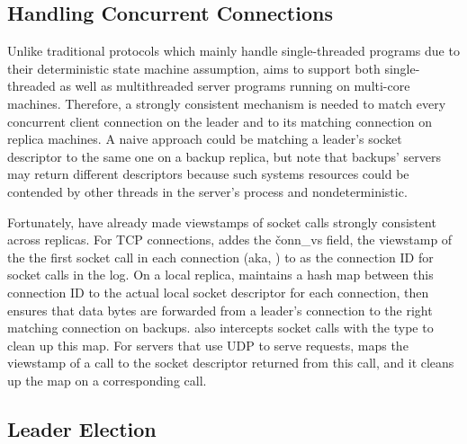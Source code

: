 
\subsection{Handling Concurrent Connections} \label{sec:concurrent}

Unlike traditional \paxos protocols which mainly handle single-threaded 
programs due to their deterministic state machine assumption, \xxx aims to 
support both single-threaded as well as multithreaded server programs running 
on multi-core machines. Therefore, a strongly consistent mechanism is needed to 
match every concurrent client connection on the leader and to its matching 
connection on replica machines. A naive approach could be matching a leader's 
socket descriptor to the same one on a backup replica, but note that backups' 
servers may return different descriptors because such systems resources could 
be contended by other threads in the server's process and nondeterministic.

Fortunately, \paxos have already made viewstamps of socket calls strongly 
consistent across replicas. For TCP connections, \xxx addes the 
\v{conn\_vs} field, the viewstamp of the the first socket call in each 
connection (aka, \accept) to as the connection ID for socket calls in the 
log. On a local replica, \xxx maintains a hash map between this connection ID 
to the actual local socket descriptor for each connection, then \xxx ensures 
that data bytes are forwarded from a leader's connection to the right matching 
connection on backups. \xxx also intercepts socket calls with the \close type 
to clean up this map. For servers that use UDP to serve requests, \xxx maps the 
viewstamp of a \recvfrom call to the socket descriptor returned from this call, 
and it cleans up the map on a corresponding \sendto call. 






\subsection{Leader Election} \label{sec:election}


